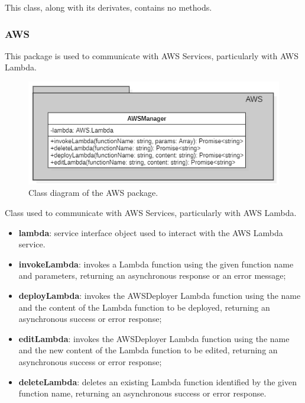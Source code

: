 	This class, along with its derivates, contains no methods.
	\subsubsection{AWS}
	This package is used to communicate with AWS Services, particularly with AWS Lambda.
	\begin{figure} [h!]
		\centering
		\includegraphics[width=0.8\linewidth]{diagrammi/etherless-server/AWS}
		\caption{Class diagram of the AWS package.}
	\end{figure}
	Class used to communicate with AWS Services, particularly with AWS Lambda.
	\begin{itemize}
		\item \textbf{lambda}: service interface object used to interact with the AWS Lambda service.
	\end{itemize}
	\begin{itemize}
		\item \textbf{invokeLambda}: invokes a Lambda function using the given function name and parameters, returning an asynchronous response or an error message;
		\item \textbf{deployLambda}: invokes the AWSDeployer Lambda function using the name and the content of the Lambda function to be deployed, returning an asynchronous success or error response;
		\item \textbf{editLambda}: invokes the AWSDeployer Lambda function using the name and the new content of the Lambda function to be edited, returning an asynchronous success or error response;
		\item \textbf{deleteLambda}: deletes an existing Lambda function identified by the given function name, returning an asynchronous success or error response.
	\end{itemize}
